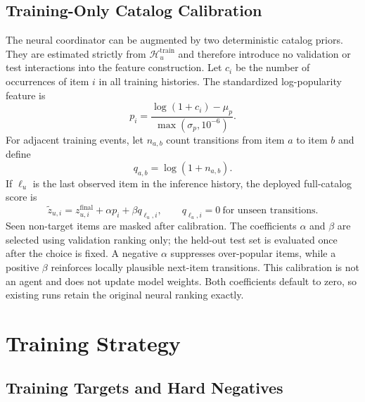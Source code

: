 \documentclass[11pt,a4paper]{article}
\begin{document}
\subsection{Training-Only Catalog Calibration}

The neural coordinator can be augmented by two deterministic catalog priors.
They are estimated strictly from $\mathcal H_u^{\mathrm{train}}$ and therefore
introduce no validation or test interactions into the feature construction.
Let $c_i$ be the number of occurrences of item $i$ in all training histories.
The standardized log-popularity feature is
\begin{equation}
  p_i=
  \frac{\log(1+c_i)-\mu_p}{\max(\sigma_p,10^{-6})}.
\end{equation}
For adjacent training events, let $n_{a,b}$ count transitions from item $a$ to
item $b$ and define
\begin{equation}
  q_{a,b}=\log(1+n_{a,b}).
\end{equation}
If $\ell_u$ is the last observed item in the inference history, the deployed
full-catalog score is
\begin{equation}
  \widetilde z_{u,i}
  =
  z_{u,i}^{\mathrm{final}}
  +\alpha p_i
  +\beta q_{\ell_u,i},
  \qquad q_{\ell_u,i}=0\ \text{for unseen transitions}.
\end{equation}
Seen non-target items are masked after calibration. The coefficients $\alpha$
and $\beta$ are selected using validation ranking only; the held-out test set
is evaluated once after the choice is fixed. A negative $\alpha$ suppresses
over-popular items, while a positive $\beta$ reinforces locally plausible
next-item transitions. This calibration is not an agent and does not update
model weights. Both coefficients default to zero, so existing runs retain the
original neural ranking exactly.

\section{Training Strategy}

\subsection{Training Targets and Hard Negatives}
\end{document}
